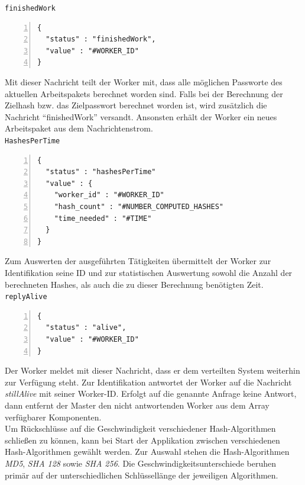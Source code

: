 \texttt{finishedWork}
\begin{lstlisting}[basicstyle=\ttfamily,numbers=left,numberstyle=\footnotesize\ttfamily,backgroundcolor=\color{sourcegray}]
{
  "status" : "finishedWork",
  "value" : "#WORKER_ID"
}
\end{lstlisting}
Mit dieser Nachricht teilt der Worker mit, dass alle möglichen Passworte des aktuellen Arbeitspakets berechnet worden sind. Falls bei der Berechnung der Zielhash bzw. das Zielpasswort berechnet worden ist, wird zusätzlich die Nachricht \enquote{finishedWork} versandt. Ansonsten erhält der Worker ein neues Arbeitspaket aus dem Nachrichtenstrom. \\

\texttt{HashesPerTime}
\begin{lstlisting}[basicstyle=\ttfamily,numbers=left,numberstyle=\footnotesize\ttfamily,backgroundcolor=\color{sourcegray}]
{
  "status" : "hashesPerTime"
  "value" : {
    "worker_id" : "#WORKER_ID"
    "hash_count" : "#NUMBER_COMPUTED_HASHES"
    "time_needed" : "#TIME"
  }
}
\end{lstlisting}
Zum Auswerten der ausgeführten Tätigkeiten übermittelt der Worker zur Identifikation seine ID und zur statistischen Auswertung sowohl die Anzahl der berechneten Hashes, als auch die zu dieser Berechnung benötigten Zeit. \\

\texttt{replyAlive}
\begin{lstlisting}[basicstyle=\ttfamily,numbers=left,numberstyle=\footnotesize\ttfamily,backgroundcolor=\color{sourcegray}]
{
  "status" : "alive",
  "value" : "#WORKER_ID"
}
\end{lstlisting}
Der Worker meldet mit dieser Nachricht, dass er dem verteilten System weiterhin zur Verfügung steht. Zur Identifikation antwortet der Worker auf die Nachricht 
\emph{stillAlive} mit seiner Worker-ID. Erfolgt auf die genannte Anfrage keine Antwort, dann entfernt der Master den nicht antwortenden Worker aus dem Array verfügbarer Komponenten.\\

Um Rückschlüsse auf die Geschwindigkeit verschiedener Hash-Algorithmen schließen zu können, kann bei Start der Applikation zwischen verschiedenen Hash-Algorithmen gewählt werden. Zur Auswahl stehen die Hash-Algorithmen \emph{MD5}, \emph{SHA 128} sowie \emph{SHA 256}. Die Geschwindigkeitsunterschiede beruhen primär auf der unterschiedlichen Schlüssellänge der jeweiligen Algorithmen.

